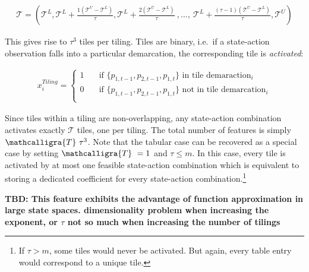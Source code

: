 \begin{gather}
\mathcal{T} = (
\mathcal{T}^L,
\mathcal{T}^L + \frac{1(\mathcal{T}^U - \mathcal{T}^L)}{\tau},
\mathcal{T}^L + \frac{2(\mathcal{T}^U - \mathcal{T}^L)}{\tau}~ , ... , ~
\mathcal{T}^L + \frac{(\tau-1)(\mathcal{T}^U - \mathcal{T}^L)}{\tau},
\mathcal{T}^U)
\end{gather}

This gives rise to $\tau^3$ tiles per tiling. Tiles are binary, i.e.\ if a state-action observation falls into a particular demarcation, the corresponding tile is \emph{activated}:

\begin{gather}\label{tile_activation}
x_i^{Tiling} = \begin{cases}
1 & \quad \text{if } \{p_{1, t-1}, p_{2, t-1}, p_{1, t}\} \text{~in tile demaraction}_i  \\
0 & \quad \text{if } \{p_{1, t-1}, p_{2, t-1}, p_{1, t}\} \text{~not in tile demarcation}_i \\ \end{cases} 
\end{gather}

Since tiles within a tiling are non-overlapping, any state-action combination activates exactly $\mathcal{T}$ tiles, one per tiling. The total number of features is simply $\mathcalligra{T}~\tau^3$. Note that the tabular case can be recovered as a special case by setting $\mathcalligra{T}~ = 1$ and $\tau \leq m$. In this case, every tile is activated by at most one feasible state-action combination which is equivalent to storing a dedicated coefficient for every state-action combination.\footnote{If $\tau > m$, some tiles would never be activated. But again, every table entry would correspond to a unique tile.}

\textbf{TBD: This feature exhibits the advantage of function approximation in large state spaces.  dimensionality problem when increasing the exponent, or $\tau$ not so much when increasing the number of tilings}
